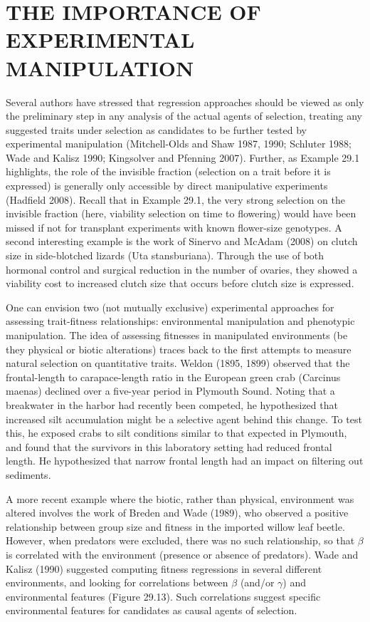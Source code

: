 \documentclass{article}
\begin{document}
\section{THE IMPORTANCE OF EXPERIMENTAL MANIPULATION}
Several authors have stressed that regression approaches should be viewed as only the preliminary step in any analysis of the actual agents of selection, treating any suggested traits under selection as candidates to be further tested by experimental manipulation (Mitchell-Olds and Shaw 1987, 1990; Schluter 1988; Wade and Kalisz 1990; Kingsolver and Pfenning 2007). Further, as Example 29.1 highlights, the role of the invisible fraction (selection on a trait before it is expressed) is generally only accessible by direct manipulative experiments (Hadfield 2008). Recall that in Example 29.1, the very strong selection on the invisible fraction (here, viability selection on time to flowering) would have been missed if not for transplant experiments with known flower-size genotypes. A second interesting example is the work of Sinervo and McAdam (2008) on clutch size in side-blotched lizards (Uta stansburiana). Through the use of both hormonal control and surgical reduction in the number of ovaries, they showed a viability cost to increased clutch size that occurs before clutch size is expressed.

One can envision two (not mutually exclusive) experimental approaches for assessing trait-fitness relationships: environmental manipulation and phenotypic manipulation. The idea of assessing fitnesses in manipulated environments (be they physical or biotic alterations) traces back to the first attempts to measure natural selection on quantitative traits. Weldon (1895, 1899) observed that the frontal-length to carapace-length ratio in the European green crab (Carcinus maenas) declined over a five-year period in Plymouth Sound. Noting that a breakwater in the harbor had recently been competed, he hypothesized that increased silt accumulation might be a selective agent behind this change. To test this, he exposed crabs to silt conditions similar to that expected in Plymouth, and found that the survivors in this laboratory setting had reduced frontal length. He hypothesized that narrow frontal length had an impact on filtering out sediments.

A more recent example where the biotic, rather than physical, environment was altered involves the work of Breden and Wade (1989), who observed a positive relationship between group size and fitness in the imported willow leaf beetle. However, when predators were excluded, there was no such relationship, so that  $ \beta $ is correlated with the environment (presence or absence of predators). Wade and Kalisz (1990) suggested computing fitness regressions in several different environments, and looking for correlations between  $ \beta $ (and/or  $ \gamma $) and environmental features (Figure 29.13). Such correlations suggest specific environmental features for candidates as causal agents of selection.
\end{document}

